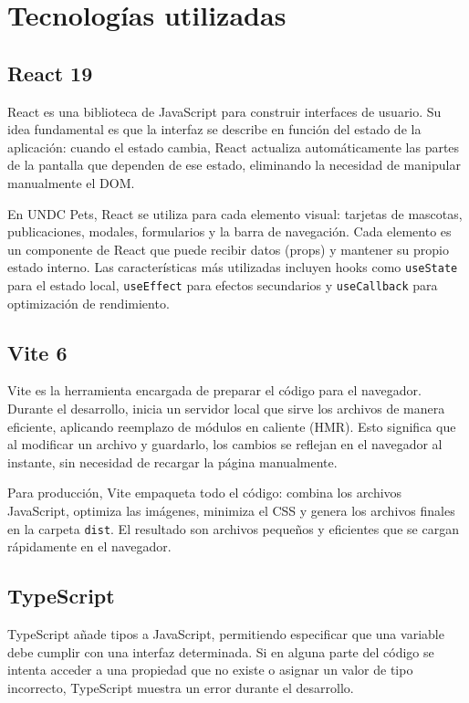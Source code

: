 \documentclass[12pt,a4paper]{article}
\begin{document}
\section{Tecnologías utilizadas}

\subsection{React 19}

React es una biblioteca de JavaScript para construir interfaces de usuario. Su idea fundamental es que la interfaz se describe en función del estado de la aplicación: cuando el estado cambia, React actualiza automáticamente las partes de la pantalla que dependen de ese estado, eliminando la necesidad de manipular manualmente el DOM.

En UNDC Pets, React se utiliza para cada elemento visual: tarjetas de mascotas, publicaciones, modales, formularios y la barra de navegación. Cada elemento es un componente de React que puede recibir datos (props) y mantener su propio estado interno. Las características más utilizadas incluyen hooks como \texttt{useState} para el estado local, \texttt{useEffect} para efectos secundarios y \texttt{useCallback} para optimización de rendimiento.

\subsection{Vite 6}

Vite es la herramienta encargada de preparar el código para el navegador. Durante el desarrollo, inicia un servidor local que sirve los archivos de manera eficiente, aplicando reemplazo de módulos en caliente (HMR). Esto significa que al modificar un archivo y guardarlo, los cambios se reflejan en el navegador al instante, sin necesidad de recargar la página manualmente.

Para producción, Vite empaqueta todo el código: combina los archivos JavaScript, optimiza las imágenes, minimiza el CSS y genera los archivos finales en la carpeta \texttt{dist}. El resultado son archivos pequeños y eficientes que se cargan rápidamente en el navegador.

\subsection{TypeScript}

TypeScript añade tipos a JavaScript, permitiendo especificar que una variable debe cumplir con una interfaz determinada. Si en alguna parte del código se intenta acceder a una propiedad que no existe o asignar un valor de tipo incorrecto, TypeScript muestra un error durante el desarrollo.
\end{document}
